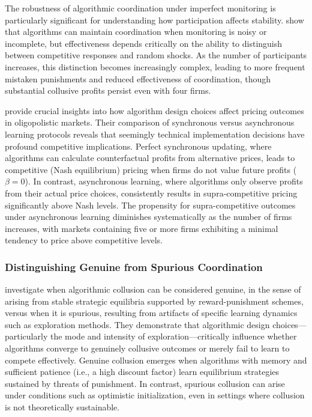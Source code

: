 The robustness of algorithmic coordination under imperfect monitoring is particularly significant for understanding how participation affects stability. \textcite{calvano_algorithmic_2021} show that algorithms can maintain coordination when monitoring is noisy or incomplete, but effectiveness depends critically on the ability to distinguish between competitive responses and random shocks. As the number of participants increases, this distinction becomes increasingly complex, leading to more frequent mistaken punishments and reduced effectiveness of coordination, though substantial collusive profits persist even with four firms.

\textcite{asker_artificial_2022, asker_impact_2024} provide crucial insights into how algorithm design choices affect pricing outcomes in oligopolistic markets. Their comparison of synchronous versus asynchronous learning protocols reveals that seemingly technical implementation decisions have profound competitive implications. Perfect synchronous updating, where algorithms can calculate counterfactual profits from alternative prices, leads to competitive (Nash equilibrium) pricing when firms do not value future profits ($\beta = 0$). In contrast, asynchronous learning, where algorithms only observe profits from their actual price choices, consistently results in supra-competitive pricing significantly above Nash levels. The propensity for supra-competitive outcomes under asynchronous learning diminishes systematically as the number of firms increases, with markets containing five or more firms exhibiting a minimal tendency to price above competitive levels.

\subsubsection*{Distinguishing Genuine from Spurious Coordination}

\textcite{calvano_algorithmic_2023} investigate when algorithmic collusion can be considered genuine, in the sense of arising from stable strategic equilibria supported by reward-punishment schemes, versus when it is spurious, resulting from artifacts of specific learning dynamics such as exploration methods. They demonstrate that algorithmic design choices—particularly the mode and intensity of exploration—critically influence whether algorithms converge to genuinely collusive outcomes or merely fail to learn to compete effectively. Genuine collusion emerges when algorithms with memory and sufficient patience (i.e., a high discount factor) learn equilibrium strategies sustained by threats of punishment. In contrast, spurious collusion can arise under conditions such as optimistic initialization, even in settings where collusion is not theoretically sustainable.

